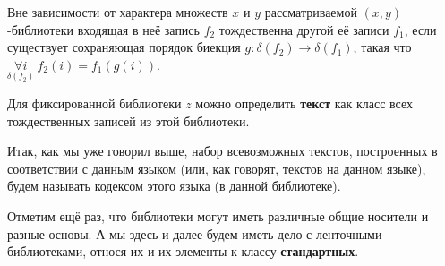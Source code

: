 \documentclass[a4paper]{article}
\begin{document}
Вне зависимости от характера множеств $x$ и $y$ рассматриваемой $(x,y)$-библиотеки входящая в неё запись $f_2$ тождественна другой её записи $f_1$, если существует сохраняющая порядок биекция $g: \delta(f_2) \rightarrow \delta(f_1)$, такая что $\underset{\delta(f_2)}{\forall i}~ f_2(i) = f_1(g(i))$.

Для фиксированной библиотеки $z$ можно определить \textbf{текст} как класс всех тождественных записей из этой библиотеки.

Итак, как мы уже говорил выше, набор всевозможных текстов, построенных в соответствии с данным языком (или, как говорят, текстов на данном языке), будем называть кодексом этого языка (в данной библиотеке).

Отметим ещё раз, что библиотеки могут иметь различные общие носители и разные основы. А мы здесь и далее будем иметь дело с ленточными библиотеками, относя их и их элементы к классу \textbf{стандартных}.

\clearpage
\end{document}
